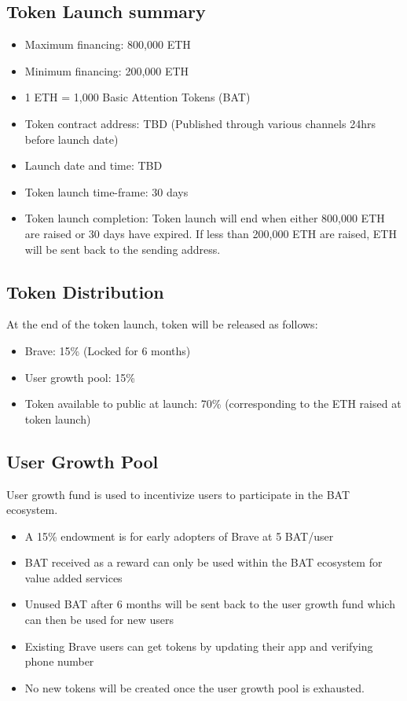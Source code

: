 \documentclass[11pt]{article}
\begin{document}
\subsection{Token Launch summary}
\label{sec-6-1}
\begin{itemize}
\item{Maximum financing: 800,000 ETH}
\item{Minimum financing:  200,000 ETH}
\item{1 ETH = 1,000 Basic Attention Tokens (BAT)}
\item{Token contract address: TBD (Published through various channels 24hrs before launch date)}
\item{Launch date and time: TBD}
\item{Token launch time-frame: 30 days}
\item{Token launch completion: Token launch will end when either 800,000 ETH are raised or 30 days have expired. If less than 200,000 ETH are raised, ETH will be sent back to the sending address.}
\end{itemize}
\subsection{Token Distribution}
\label{sec-6-2}

At the end of the token launch, token will be released as follows:
\begin{itemize}
\item{Brave: 15\% (Locked for 6 months)}
\item{User growth pool: 15\%}
\item{Token available to public at launch: 70\% (corresponding to the ETH raised at token launch)}
\end{itemize}

\subsection{User Growth Pool}
\label{sec-6-3}
User growth fund is used to incentivize users to participate in the BAT ecosystem.
\begin{itemize}
\item{A 15\% endowment is for early adopters of Brave at 5 BAT/user}
\item{BAT received as a reward can only be used within the BAT ecosystem for value added services}
\item{Unused BAT after 6 months will be sent back to the user growth fund which can then be used for new users}
\item{Existing Brave users can get tokens by updating their app and verifying phone number}
\item{No new tokens will be created once the user growth pool is exhausted.}
\end{itemize}
\end{document}
